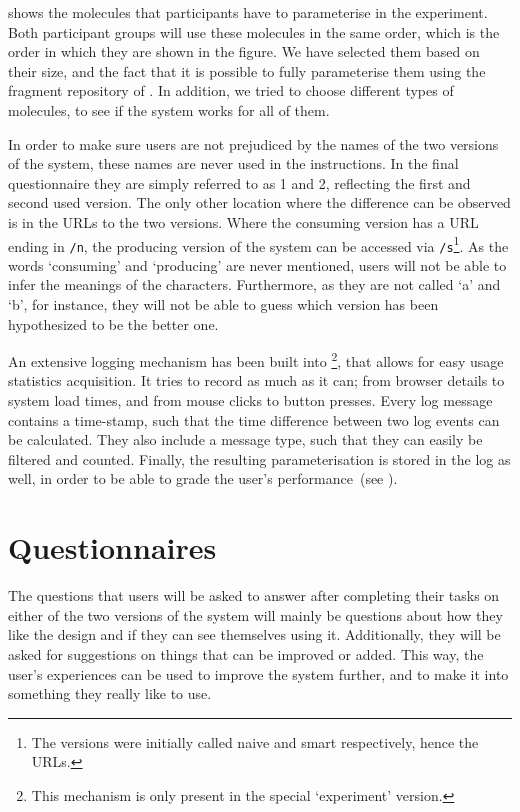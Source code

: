  shows the molecules that participants have to parameterise in the experiment. Both participant groups will use these molecules in the same order, which is the order in which they are shown in the figure. We have selected them based on their size, and the fact that it is possible to fully parameterise them using the fragment repository of \oframp. In addition, we tried to choose different types of molecules, to see if the system works for all of them.

In order to make sure users are not prejudiced by the names of the two versions of the system, these names are never used in the instructions. In the final questionnaire they are simply referred to as 1 and 2, reflecting the first and second used version. The only other location where the difference can be observed is in the URLs to the two versions. Where the consuming version has a URL ending in \verb|/n|, the producing version of the system can be accessed via \verb|/s|\footnote{The versions were initially called naive and smart respectively, hence the URLs.}. As the words `consuming' and `producing' are never mentioned, users will not be able to infer the meanings of the characters. Furthermore, as they are not called `a' and `b', for instance, they will not be able to guess which version has been hypothesized to be the better one.

An extensive logging mechanism has been built into \oframp\footnote{This mechanism is only present in the special `experiment' version.}, that allows for easy usage statistics acquisition. It tries to record as much as it can; from browser details to system load times, and from mouse clicks to button presses. Every log message contains a time-stamp, such that the time difference between two log events can be calculated. They also include a message type, such that they can easily be filtered and counted. Finally, the resulting parameterisation is stored in the log as well, in order to be able to grade the user's performance~(see ).



\section{Questionnaires}
The questions that users will be asked to answer after completing their tasks on either of the two versions of the system will mainly be questions about how they like the design and if they can see themselves using it. Additionally, they will be asked for suggestions on things that can be improved or added. This way, the user's experiences can be used to improve the system further, and to make it into something they really like to use.

